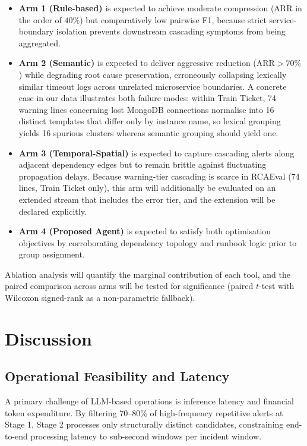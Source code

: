 \documentclass[conference]{IEEEtran}
\begin{document}
\begin{itemize}
    \item \textbf{Arm 1 (Rule-based)} is expected to achieve moderate compression ($\text{ARR}$ in the order of $40\%$) but comparatively low pairwise F1, because strict service-boundary isolation prevents downstream cascading symptoms from being aggregated.
    \item \textbf{Arm 2 (Semantic)} is expected to deliver aggressive reduction ($\text{ARR} > 70\%$) while degrading root cause preservation, erroneously collapsing lexically similar timeout logs across unrelated microservice boundaries. A concrete case in our data illustrates both failure modes: within Train Ticket, 74 warning lines concerning lost MongoDB connections normalise into 16 distinct templates that differ only by instance name, so lexical grouping yields 16 spurious clusters whereas semantic grouping should yield one.
    \item \textbf{Arm 3 (Temporal-Spatial)} is expected to capture cascading alerts along adjacent dependency edges but to remain brittle against fluctuating propagation delays. Because warning-tier cascading is scarce in RCAEval (74 lines, Train Ticket only), this arm will additionally be evaluated on an extended stream that includes the error tier, and the extension will be declared explicitly.
    \item \textbf{Arm 4 (Proposed Agent)} is expected to satisfy both optimisation objectives by corroborating dependency topology and runbook logic prior to group assignment.
\end{itemize}

Ablation analysis will quantify the marginal contribution of each tool, and the paired comparison across arms will be tested for significance (paired $t$-test with Wilcoxon signed-rank as a non-parametric fallback).

\section{Discussion}
\subsection{Operational Feasibility and Latency}
A primary challenge of LLM-based operations is inference latency and financial token expenditure. By filtering 70--80\% of high-frequency repetitive alerts at Stage 1, Stage 2 processes only structurally distinct candidates, constraining end-to-end processing latency to sub-second windows per incident window.
\end{document}
